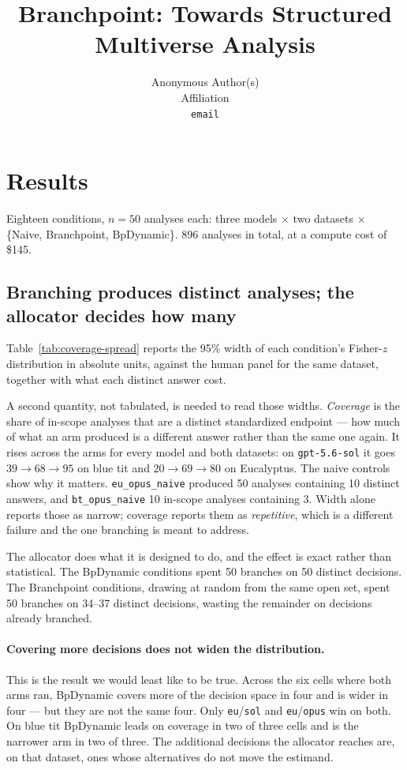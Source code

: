 \documentclass{article}
\title{Branchpoint: Towards Structured Multiverse Analysis}
\author{%
  Anonymous Author(s) \\
  Affiliation \\
  \texttt{email} \\
}
\begin{document}
\maketitle

\section{Results}
\label{sec:results}

Eighteen conditions, $n = 50$ analyses each: three models $\times$ two datasets
$\times$ \{Naive, Branchpoint, BpDynamic\}. 896 analyses in total, at a compute
cost of \$145.

\subsection{Branching produces distinct analyses; the allocator decides how many}
\label{sec:results-coverage}



Table~\ref{tab:coverage-spread} reports the 95\% width of each condition's
Fisher-$z$ distribution in absolute units, against the human panel for the same
dataset, together with what each distinct answer cost.

A second quantity, not tabulated, is needed to read those widths.
\emph{Coverage} is the share of in-scope analyses that are a distinct
standardized endpoint --- how much of what an arm produced is a different answer
rather than the same one again. It rises across the arms for every model and
both datasets: on \texttt{gpt-5.6-sol} it goes $39 \to 68 \to 95$ on blue tit
and $20 \to 69 \to 80$ on Eucalyptus. The naive controls show why it matters.
\texttt{eu\_opus\_naive} produced 50 analyses containing 10 distinct answers,
and \texttt{bt\_opus\_naive} 10 in-scope analyses containing 3. Width alone
reports those as narrow; coverage reports them as \emph{repetitive}, which is a
different failure and the one branching is meant to address.

The allocator does what it is designed to do, and the effect is exact rather
than statistical. The BpDynamic conditions spent 50 branches on 50 distinct
decisions. The Branchpoint conditions, drawing at random from the same open set,
spent 50 branches on 34--37 distinct decisions, wasting the remainder on
decisions already branched.

\paragraph{Covering more decisions does not widen the distribution.}
This is the result we would least like to be true. Across the six cells where
both arms ran, BpDynamic covers more of the decision space in four and is wider
in four --- but they are not the same four. Only \texttt{eu}/\texttt{sol} and
\texttt{eu}/\texttt{opus} win on both. On blue tit BpDynamic leads on coverage
in two of three cells and is the narrower arm in two of three. The additional
decisions the allocator reaches are, on that dataset, ones whose alternatives do
not move the estimand.
\end{document}
